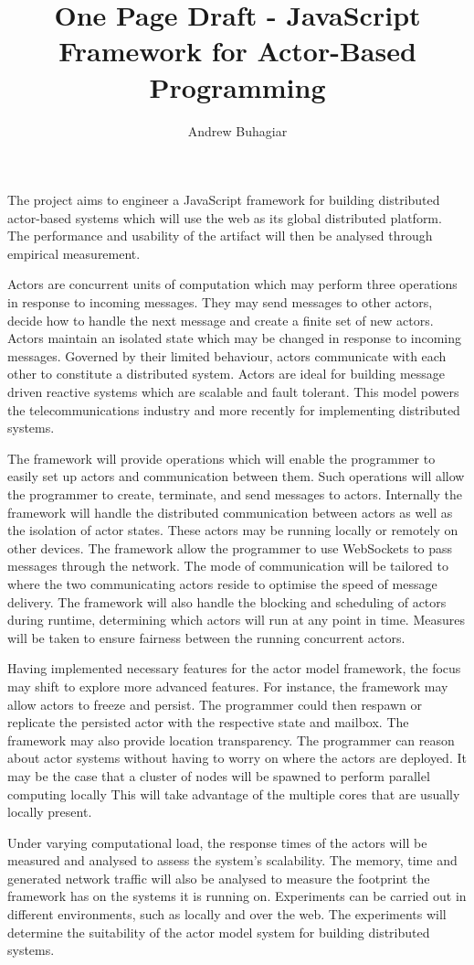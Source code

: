 \documentclass[12pt]{report}
\author{Andrew Buhagiar}
\title{One Page Draft - JavaScript Framework for Actor-Based Programming}
\begin{document}
\maketitle
The project aims to engineer a JavaScript framework for building distributed actor-based systems which will use the web as its global distributed platform. The performance and usability of the artifact will then be analysed through empirical measurement.

Actors are concurrent units of computation which may perform three operations in response to incoming messages\cite{agha_1985}. They may send messages to other actors, decide how to handle the next message and create a finite set of new actors. Actors maintain an isolated state which may be changed in response to incoming messages. Governed by their limited behaviour, actors communicate with each other to constitute a distributed system. Actors are ideal for building message driven reactive systems\cite{reactivemanifesto} which are scalable and fault tolerant. This model powers the telecommunications industry and more recently for implementing distributed systems.

The framework will provide operations which will enable the programmer to easily set up actors and communication between them. Such operations will allow the programmer to create, terminate, and send messages to actors. Internally the framework will handle the distributed communication between actors as well as the isolation of actor states. These actors may be running locally or remotely on other devices. The framework allow the programmer to use WebSockets to pass messages through the network. The mode of communication will be tailored to where the two communicating actors reside to optimise the speed of message delivery. The framework will also handle the blocking and scheduling of actors during runtime, determining which actors will run at any point in time. Measures will be taken to ensure fairness between the running concurrent actors.

Having implemented necessary features for the actor model framework, the focus may shift to explore more advanced features. For instance, the framework may allow actors to freeze and persist. The programmer could then respawn or replicate the persisted actor with the respective state and mailbox. The framework may also provide location transparency. The programmer can reason about actor systems without having to worry on where the actors are deployed. It may be the case that a cluster of nodes will be spawned to perform parallel computing locally This will take advantage of the multiple cores that are usually locally present.

Under varying computational load, the response times of the actors will be measured and analysed to assess the system’s scalability. The memory, time and generated network traffic will also be analysed to measure the footprint the framework has on the systems it is running on. Experiments can be carried out in different environments, such as locally and over the web. The experiments will determine the suitability of the actor model system for building distributed systems.


\end{document}

